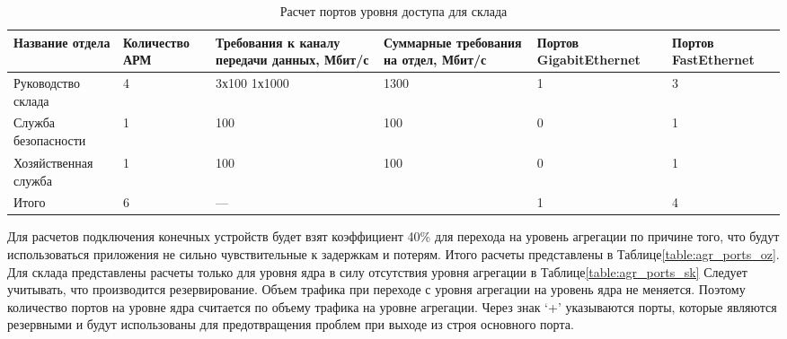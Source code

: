 \begin{table}[H]
    \centering
	\caption{Расчет портов уровня доступа для склада\label{table:dostup_ports_sk}}
    \small
	\begin{tabularx}{\textwidth}{|p{2.5cm}|X|X|X|p{2.5cm}|X|}
        \hline
		Название отдела&Количество АРМ&Требования к каналу передачи данных, Мбит/с&Суммарные требования на отдел, Мбит/с & Портов GigabitEthernet & Портов FastEthernet \\
        \hline
		Руководство склада		        & 4       		&  	3х100 1х1000	&	1300  & 1 & 3	\\
		\hline
		Служба безопасности				& 1				& 	100				&	100	  & 0 & 1 \\
		\hline
		Хозяйственная служба			& 1         	&  	100				&	100   & 0 & 1 \\
        \hline
		Итого							& 6	& \multicolumn{2}{X|}{---}			  & 1 & 4\\
		\hline
    \end{tabularx}
\end{table}

Для расчетов подключения конечных устройств будет взят коэффициент 40\% для перехода на уровень агрегации по причине того, что будут использоваться приложения не сильно чувствительные к задержкам и потерям. Итого расчеты представлены в Таблице\;\ref{table:agr_ports_oz}. Для склада представлены расчеты только для уровня ядра в силу отсутствия уровня агрегации в Таблице\;\ref{table:agr_ports_sk} Следует учитывать, что производится резервирование. Объем трафика при переходе с уровня агрегации на уровень ядра не меняется. Поэтому количество портов на уровне ядра считается по объему трафика на уровне агрегации. Через знак `+' указываются порты, которые являются резервными и будут использованы для предотвращения проблем при выходе из строя основного порта. 


